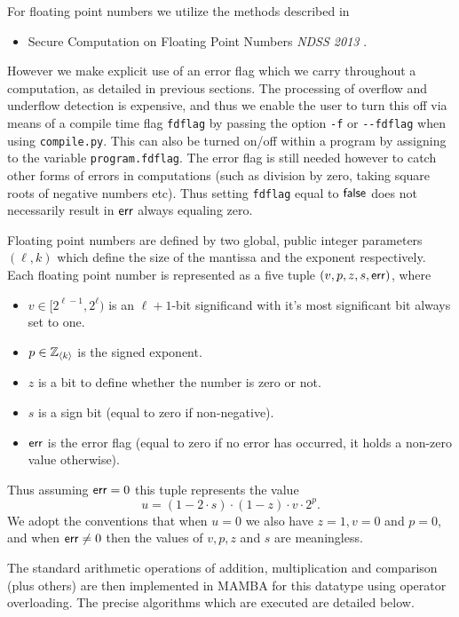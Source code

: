 
For floating point numbers we utilize the methods described in
\begin{itemize}
\item Secure Computation on Floating Point Numbers {\em NDSS 2013} \cite{ABZS13}.
\end{itemize}
However we make explicit use of an error flag which we carry throughout
a computation, as detailed in previous sections.
The processing of overflow and underflow detection is expensive,
and thus we enable the user to turn this off via
means of a compile time flag \verb+fdflag+ by passing the option 
\verb+-f+ or \verb+--fdflag+ when using \verb|compile.py|.
This can also be turned on/off within a program by assigning
to the variable \verb+program.fdflag+.
The error flag is still needed however to catch other forms of errors
in computations (such as division by zero, taking square roots of
negative numbers etc). 
Thus setting \verb+fdflag+ equal to ${\mathsf{false}}$
does not necessarily result in $\mathsf{err}$ always equaling zero.

Floating point numbers are defined by two global, public integer parameters
$(\ell,k)$ which define the size of the mantissa and the exponent respectively.
Each floating point number is represented as a five tuple $(v,p,z,s,\mathsf{err})$, where
\begin{itemize}
\item $v \in [2^{\ell-1},2^\ell)$ is an $\ell+1$-bit significand with it's most
significant bit always set to one.
\item $p \in {\mathbb{Z}}_{\langle k \rangle}$ is the signed exponent.
\item $z$ is a bit to define whether the number is zero or not.
\item $s$ is a sign bit (equal to zero if non-negative).
\item $\mathsf{err}$ is the error flag (equal to zero if no error has occurred, it holds a non-zero value otherwise).
\end{itemize}
Thus assuming $\mathsf{err}=0$ this tuple represents the value
\[ u=(1- 2 \cdot s) \cdot (1-z) \cdot v \cdot 2^p. \]
We adopt the conventions that when $u=0$ we also have $z=1, v=0$ and $p=0$,
and when $\mathsf{err} \ne 0$ then the values of $v,p,z$ and $s$ are meaningless.

The standard arithmetic operations of addition, multiplication and
comparison (plus others) are then implemented in MAMBA for this datatype using
operator overloading. The precise algorithms which are executed
are detailed below.

